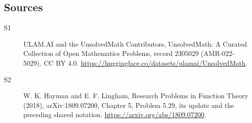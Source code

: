 \documentclass[11pt]{article}
\begin{document}
\subsection{Sources}
\begin{description}
\item[\hypertarget{source:2305029:1}{S1}] ULAM.AI and the UnsolvedMath Contributors, UnsolvedMath: A Curated Collection of Open Mathematics Problems, record 2305029 (AMR-022-5029). CC BY 4.0. \url{https://huggingface.co/datasets/ulamai/UnsolvedMath}.
\item[\hypertarget{source:2305029:2}{S2}] W. K. Hayman and E. F. Lingham, Research Problems in Function Theory (2018), arXiv:1809.07200, Chapter 5, Problem 5.29, its update and the preceding shared notation. \url{https://arxiv.org/abs/1809.07200}.
\end{description}
\label{end:2305029}
\end{document}
